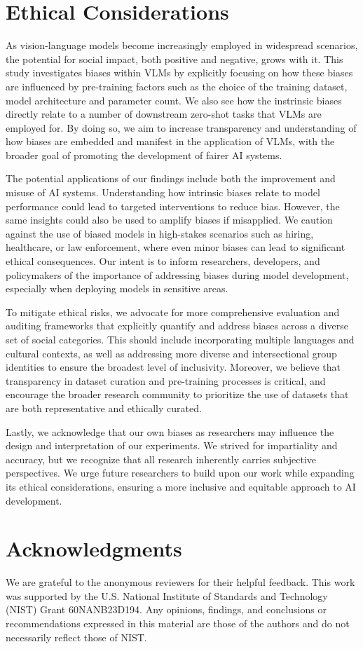 \section*{Ethical Considerations}
As vision-language models become increasingly employed in widespread scenarios, the potential for social impact, both positive and negative, grows with it. This study investigates biases within VLMs by explicitly focusing on how these biases are influenced by pre-training factors such as the choice of the training dataset, model architecture and parameter count. We also see how the instrinsic biases directly relate to a number of downstream zero-shot tasks that VLMs are employed for. By doing so, we aim to increase transparency and understanding of how biases are embedded and manifest in the application of VLMs, with the broader goal of promoting the development of fairer AI systems.

The potential applications of our findings include both the improvement and misuse of AI systems. Understanding how intrinsic biases relate to model performance could lead to targeted interventions to reduce bias. However, the same insights could also be used to amplify biases if misapplied. We caution against the use of biased models in high-stakes scenarios such as hiring, healthcare, or law enforcement, where even minor biases can lead to significant ethical consequences. Our intent is to inform researchers, developers, and policymakers of the importance of addressing biases during model development, especially when deploying models in sensitive areas.

To mitigate ethical risks, we advocate for more comprehensive evaluation and auditing frameworks that explicitly quantify and address biases across a diverse set of social categories. This should include incorporating multiple languages and cultural contexts, as well as addressing more diverse and intersectional group identities to ensure the broadest level of inclusivity. Moreover, we believe that transparency in dataset curation and pre-training processes is critical, and encourage the broader research community to prioritize the use of datasets that are both representative and ethically curated.

Lastly, we acknowledge that our own biases as researchers may influence the design and interpretation of our experiments. We strived for impartiality and accuracy, but we recognize that all research inherently carries subjective perspectives. We urge future researchers to build upon our work while expanding its ethical considerations, ensuring a more inclusive and equitable approach to AI development.

\section*{Acknowledgments}
We are grateful to the anonymous reviewers for their helpful feedback. This work was supported by the U.S. National Institute of Standards and Technology (NIST) Grant 60NANB23D194. Any opinions, findings, and conclusions or recommendations expressed in this material are those of the authors and do not necessarily reflect those of NIST.